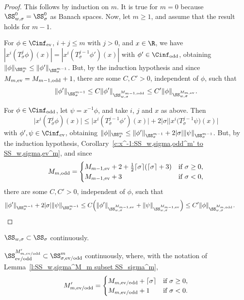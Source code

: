 \begin{proof}
  This follows by induction on $m$. It is true for $m=0$ because $\SS_{w,\sigma}^0=\SS_\sigma^0$ as Banach spaces. Now, let $m\ge1$, and assume that the result holds for $m-1$.

  For $\phi\in\Cinf_{\text{\rm ev}}$, $i+j\le m$ with $j>0$, and $x\in\R$, we have $|x^i(T_\sigma^j\phi)(x)|=|x^i(T_\sigma^{j-1}\phi')(x)|$ with $\phi'\in \Cinf_{\text{\rm odd}}$, obtaining $\|\phi\|_{\SS_\sigma^m}\le\|\phi'\|_{\SS_\sigma^{m-1}}$. But, by the induction hypothesis and since $M_{m,\text{\rm ev}}=M_{m-1,\text{\rm odd}}+1$, there are some $C,C'>0$, independent of $\phi$, such that
    \[
      \|\phi'\|_{\SS_\sigma^{m-1}}\le C \|\phi'\|_{\SS_{w,\sigma}^{M_{m-1,\text{\rm odd}}}}\le C' \|\phi\|_{\SS_{w,\sigma}^{M_{m,\text{\rm ev}}}} .
    \]

  For $\phi\in \Cinf_{\text{\rm odd}}$, let $\psi=x^{-1}\phi$, and take $i$, $j$ and $x$ as above. Then
    \[
      \big|x^i(T_\sigma^j\phi)(x)\big|\le \big|x^i(T_\sigma^{j-1}\phi')(x)\big|
      +2 |\sigma|\big|x^i\big(T_\sigma^{j-1}\psi\big)(x)\big|
    \]
  with $\phi',\psi\in\Cinf_{\text{\rm ev}}$, obtaining $\|\phi\|_{\SS_\sigma^m}\le\|\phi'\|_{\SS_\sigma^{m-1}}+2 |\sigma| \|\psi\|_{\SS_\sigma^{m-1}}$. But, by the induction hypothesis, Corollary~\ref{c:x^-1:SS_w,sigma,odd^m' to SS_w,sigma,ev^m}, and since
    \[
      M_{m,\text{\rm odd}}=
        \begin{cases}
          M_{m-1,\text{\rm ev}}+2+\frac{1}{2}\lceil\sigma\rceil(\lceil\sigma\rceil+3) & \text{if $\sigma\ge0$},\\
          M_{m-1,\text{\rm ev}}+3 & \text{if $\sigma<0$} ,
        \end{cases}
    \]
  there are some $C,C'>0$, independent of $\phi$, such that
    \begin{gather*}
      \|\phi'\|_{\SS_\sigma^{m-1}}+2 |\sigma| \|\psi\|_{\SS_\sigma^{m-1}}
      \le C\Big(\|\phi'\|_{\SS_{w,\sigma}^{M_{m-1,\text{\rm ev}}}}
      +\|\psi\|_{\SS_{w,\sigma}^{M_{m-1,\text{\rm ev}}}}\Big)
      \le C' \|\phi\|_{\SS_{w,\sigma}^{M_{m,\text{\rm odd}}}} .\tag*{\qed}
    \end{gather*}
\renewcommand{\qed}{}
\end{proof}

\begin{Corollary}\label{c:SS_w,sigma subset SS_sigma}
  $\SS_{w,\sigma}\subset\SS_\sigma$ continuously.
\end{Corollary}

\begin{Corollary}\label{l:SS_ev/odd^M_m,ev/odd subset SS_sigma,ev/odd^m}
  $\SS_{\text{\rm ev/odd}}^{M'_{m,\text{\rm ev/odd}}}\subset\SS_{\sigma,\text{\rm ev/odd}}^m$ continuously, where, with the notation of Lemma~{\rm \ref{l:SS_w,sigma^M_m subset SS_sigma^m}},
    \[
      M'_{m,\text{\rm ev/odd}}=
        \begin{cases}
          M_{m,\text{\rm ev/odd}}+\lceil\sigma\rceil & \text{if $\sigma\ge0$},\\
          M_{m,\text{\rm ev/odd}}+1 & \text{if $\sigma<0$} .
        \end{cases}
    \]
\end{Corollary}


